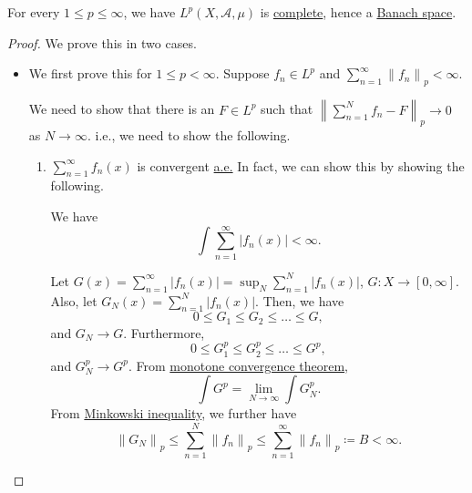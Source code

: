 \begin{theorem}\label{thm:Riesz-Fischer-theorem}
	For every \(1\leq p\leq \infty \), we have \(L^p(X, \mathcal{A} , \mu )\) is \hyperref[def:complete]{complete}, hence a
	\hyperref[def:Banach-space]{Banach space}.
\end{theorem}
\begin{proof}
	We prove this in two cases.
	\begin{itemize}
		\item We first prove this for \(1\leq p<\infty \). Suppose \(f_{n} \in L^p\) and \(\sum\limits_{n=1}^{\infty} \left\lVert f_{n} \right\rVert_{p}<\infty \).

		      We need to show that there is an \(F\in L^p\) such that \(\left\lVert \sum\limits_{n=1}^{N} f_{n} -F\right\rVert_{p}\to 0\) as \(N\to \infty \). i.e., we need to show
		      the following.
		      \begin{enumerate}
			      \item \(\sum\limits_{n=1}^{\infty} f_{n}(x)\) is convergent \hyperref[def:mu-almost-everywhere]{a.e.} In fact, we can show this by showing the following.
			            \begin{claim}
				            We have
				            \[
					            \int \sum\limits_{n=1}^{\infty} \left\vert f_{n} (x) \right\vert < \infty .
				            \]
			            \end{claim}
			            \begin{explanation}
				            Let \(G(x) = \sum\limits_{n=1}^{\infty} \left\vert f_{n} (x) \right\vert = \sup _N \sum\limits_{n=1}^{N} \left\vert f_{n} (x) \right\vert  \), \(G\colon X\to [0, \infty ]\). Also, let
				            \(G_{N} (x)= \sum\limits_{n=1}^{N} \left\vert f_{n} (x) \right\vert \). Then, we have
				            \[
					            0\leq G_{1} \leq G_2 \leq \ldots \leq G,
				            \]
				            and \(G_{N} \to G \). Furthermore,
				            \[
					            0\leq G^p_1 \leq G^p_2 \leq \ldots \leq G^p,
				            \]
				            and \(G^p_N \to G^p\). From \hyperref[thm:MCT]{monotone convergence theorem},
				            \[
					            \int G^p = \lim\limits_{N \to \infty} \int G^p_N.
				            \]
				            From \hyperref[thm:Minkowski-inequality]{Minkowski inequality}, we further have
				            \[
					            \left\lVert G_N\right\rVert _p \leq \sum\limits_{n=1}^{N} \left\lVert f_{n} \right\rVert _p \leq \sum\limits_{n=1}^{\infty} \left\lVert f_{n} \right\rVert _p \coloneqq B < \infty.
\]
\end{explanation}
\end{enumerate}
\end{itemize}
\end{proof}
